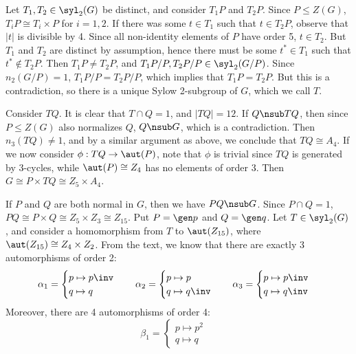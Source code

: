 \begin{solenum}[spsol]
    Let $T_1, T_2 \in \syl_2(G)$ be distinct, and consider $T_1P$ and $T_2P$.
	Since $P \leq Z(G)$, $T_iP \cong T_i \times P$ for $i = 1, 2$.
	If there was some $t \in T_1$ such that $t \in T_2P$, observe that $|t|$ is divisible by 4.
	Since all non-identity elements of $P$ have order 5, $t \in T_2$.
	But $T_1$ and $T_2$ are distinct by assumption, hence there must be some $t^* \in T_1$ such that $t^* \notin T_2P$.
	Then $T_1P \neq T_2P$, and $T_1P/P, T_2P/P \in \syl_2(G/P)$.
	Since $n_2(G/P) = 1$, $T_1P/P = T_2P/P$, which implies that $T_1P = T_2P$.
	But this is a contradiction, so there is a unique Sylow 2-subgroup of $G$, which we call $T$.

    Consider $TQ$.
	It is clear that $T \cap Q = 1$, and $|TQ| = 12$.
	If $Q \nsub TQ$, then since $P \leq Z(G)$ also normalizes $Q$, $Q \nsub G$, which is a contradiction.
	Then $n_3(TQ) \neq 1$, and by a similar argument as above, we conclude that $TQ \cong A_4$.
	If we now consider $\phi : TQ \to \aut(P)$, note that $\phi$ is trivial since $TQ$ is generated by 3-cycles, while $\aut(P) \cong Z_4$ has no elements of order 3.
	Then $G \cong P \times TQ \cong Z_5 \times A_4$.
    \item If $P$ and $Q$ are both normal in $G$, then we have $PQ \nsub G$.
	Since $P \cap Q = 1$, $PQ \cong P \times Q \cong Z_5 \times Z_3 \cong Z_{15}$.
	Put $P = \gen p$ and $Q = \gen q$.
	Let $T \in \syl_2(G)$, and consider a homomorphism from $T$ to $\aut(Z_{15})$, where $\aut(Z_{15}) \cong Z_4 \times Z_2$.
	From the text, we know that there are exactly 3 automorphisms of order 2:
    \[
    	\alpha_1 = 
        \begin{cases}
            p \mapsto p\inv \\
            q \mapsto q
        \end{cases} \quad
        \alpha_2 = 
        \begin{cases}
            p \mapsto p \\
            q \mapsto q\inv
        \end{cases} \quad
        \alpha_3 = 
        \begin{cases}
            p \mapsto p\inv \\
            q \mapsto q\inv
        \end{cases}
	\]
    Moreover, there are 4 automorphisms of order 4:
    \[
    	\beta_1 = 
        \begin{cases}
            p \mapsto p^2 \\
            q \mapsto q
        \end{cases} \quad
\]
\end{solenum}

